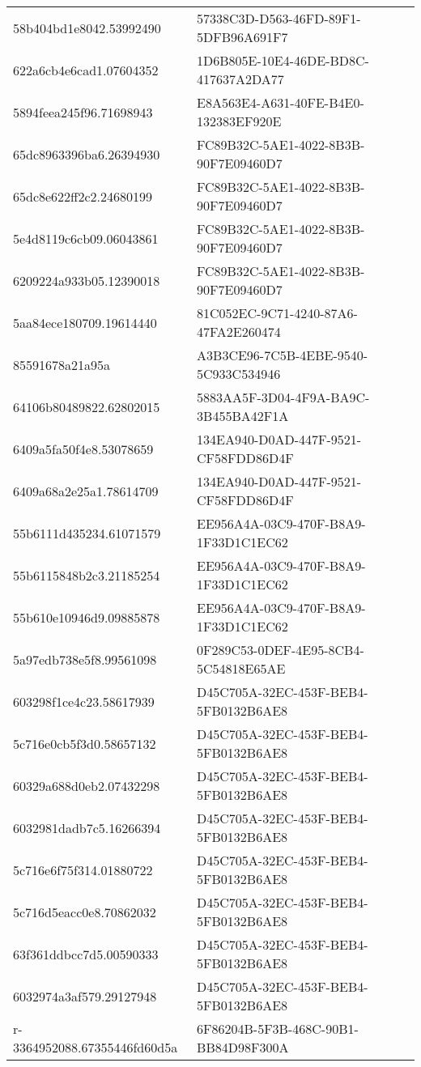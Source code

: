 \begin{tabular}{ll}
58b404bd1e8042.53992490 & 57338C3D-D563-46FD-89F1-5DFB96A691F7 \\
622a6cb4e6cad1.07604352 & 1D6B805E-10E4-46DE-BD8C-417637A2DA77 \\
5894feea245f96.71698943 & E8A563E4-A631-40FE-B4E0-132383EF920E \\
65dc8963396ba6.26394930 & FC89B32C-5AE1-4022-8B3B-90F7E09460D7 \\
65dc8e622ff2c2.24680199 & FC89B32C-5AE1-4022-8B3B-90F7E09460D7 \\
5e4d8119c6cb09.06043861 & FC89B32C-5AE1-4022-8B3B-90F7E09460D7 \\
6209224a933b05.12390018 & FC89B32C-5AE1-4022-8B3B-90F7E09460D7 \\
5aa84ece180709.19614440 & 81C052EC-9C71-4240-87A6-47FA2E260474 \\
85591678a21a95a & A3B3CE96-7C5B-4EBE-9540-5C933C534946 \\
64106b80489822.62802015 & 5883AA5F-3D04-4F9A-BA9C-3B455BA42F1A \\
6409a5fa50f4e8.53078659 & 134EA940-D0AD-447F-9521-CF58FDD86D4F \\
6409a68a2e25a1.78614709 & 134EA940-D0AD-447F-9521-CF58FDD86D4F \\
55b6111d435234.61071579 & EE956A4A-03C9-470F-B8A9-1F33D1C1EC62 \\
55b6115848b2c3.21185254 & EE956A4A-03C9-470F-B8A9-1F33D1C1EC62 \\
55b610e10946d9.09885878 & EE956A4A-03C9-470F-B8A9-1F33D1C1EC62 \\
5a97edb738e5f8.99561098 & 0F289C53-0DEF-4E95-8CB4-5C54818E65AE \\
603298f1ce4c23.58617939 & D45C705A-32EC-453F-BEB4-5FB0132B6AE8 \\
5c716e0cb5f3d0.58657132 & D45C705A-32EC-453F-BEB4-5FB0132B6AE8 \\
60329a688d0eb2.07432298 & D45C705A-32EC-453F-BEB4-5FB0132B6AE8 \\
6032981dadb7c5.16266394 & D45C705A-32EC-453F-BEB4-5FB0132B6AE8 \\
5c716e6f75f314.01880722 & D45C705A-32EC-453F-BEB4-5FB0132B6AE8 \\
5c716d5eacc0e8.70862032 & D45C705A-32EC-453F-BEB4-5FB0132B6AE8 \\
63f361ddbcc7d5.00590333 & D45C705A-32EC-453F-BEB4-5FB0132B6AE8 \\
6032974a3af579.29127948 & D45C705A-32EC-453F-BEB4-5FB0132B6AE8 \\
r-3364952088.67355446fd60d5a & 6F86204B-5F3B-468C-90B1-BB84D98F300A \\

\end{tabular}
